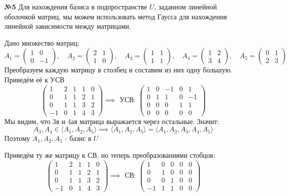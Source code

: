 \documentclass[a4paper]{article}
\newcommand{\mat}[1]{\begin{pmatrix} #1 \end{pmatrix}}
\begin{document}
\begin{enumerate}
    \item[\textbf{№5}]Для нахождения базиса в подпространстве $ U $, заданном линейной оболочкой матриц, мы можем использовать метод Гаусса для нахождения линейной зависимости между матрицами.

    
    Дано множество матриц:
    $$
    A_1 = \begin{pmatrix} 1 & 0 \\ 0 & -1 \end{pmatrix}, \quad A_2 = \begin{pmatrix} 2 & 1 \\ 1 & 0 \end{pmatrix}, \quad A_3 = \begin{pmatrix} 1 & 1 \\ 1 & 1 \end{pmatrix}, \quad A_4 = \begin{pmatrix} 1 & 2 \\ 3 & 4 \end{pmatrix}, \quad A_5 = \begin{pmatrix} 0 & 1 \\ 2 & 3 \end{pmatrix}
    $$
    Преобразуем каждую матрицу в столбец и составим из них одну большую. Приведём её к УСВ
    $$\mat{1&2&1&1&0\\
    0&1&1&2&1\\
    0&1&1&3&2\\
    -1&0&1&4&3} \implies \text{ УСВ: }
    \begin{pmatrix}
        1 & 0 & -1 & 0 & 1 \\
        0 & 1 & 1 & 0 & -1 \\
        0 & 0 & 0 & 1 & 1 \\
        0 & 0 & 0 & 0 & 0
    \end{pmatrix}$$
    Мы видим, что 3я и 4ая матрица выражается через остальные. Значит:
    $$A_3, A_4 \in \langle A_1, A_2, A_5\rangle \implies  \langle A_1, A_2, A_5\rangle =  \langle A_1, A_2, A_3, A_4, A_5\rangle$$
    Поэтому $A_1, A_2, A_5$ - базис в $U$\\


    Приведём ту же матрицу к СВ, но теперь преобразованиями стобцов:
    $$\mat{1&2&1&1&0\\
    0&1&1&2&1\\
    0&1&1&3&2\\
    -1&0&1&4&3} \implies \text{ СВ: }
    \begin{pmatrix}
        1 & 0 & 0 & 0 & 0 \\
        0 & 1 & 0 & 0 & 0 \\
        0 & 0 & 1 & 0 & 0 \\
        -1 & 1 & 1 & 0 & 0
    \end{pmatrix}$$


\end{enumerate}
\end{document}
